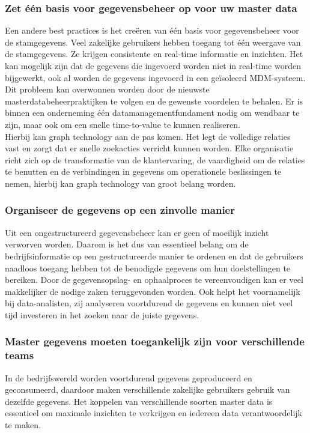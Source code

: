 \subsubsection{Zet één basis voor gegevensbeheer op voor uw master data}
Een andere best practices is het creëren van één basis voor gegevensbeheer voor de stamgegevens. Veel zakelijke gebruikers hebben toegang tot één weergave van de stamgegevens. Ze krijgen consistente en real-time informatie en inzichten. Het kan mogelijk zijn dat de gegevens die ingevoerd worden niet in real-time worden bijgewerkt, ook al worden de gegevens ingevoerd in een geïsoleerd MDM-systeem. Dit probleem kan overwonnen worden door de nieuwste masterdatabeheerpraktijken te volgen en de gewenste voordelen te behalen. Er is binnen een onderneming één datamanagementfundament nodig om wendbaar te zijn, maar ook om een snelle time-to-value te kunnen realiseren.
\\Hierbij kan graph technology aan de pas komen. Het legt de volledige relaties vast en zorgt dat er snelle zoekacties verricht kunnen worden. Elke organisatie richt zich op de transformatie van de klantervaring, de vaardigheid om de relaties te benutten en de verbindingen in gegevens om operationele beslissingen te nemen, hierbij kan graph technology van groot belang worden. 

\subsubsection{Organiseer de gegevens op een zinvolle manier}
Uit een ongestructureerd gegevensbeheer kan er geen of moeilijk inzicht verworven worden. Daarom is het dus van essentieel belang om de bedrijfsinformatie op een gestructureerde manier te ordenen en dat de gebruikers naadloos toegang hebben tot de benodigde gegevens om hun doelstellingen te bereiken. Door de gegevensopslag- en ophaalproces te vereenvoudigen kan er veel makkelijker de nodige zaken teruggevonden worden. Ook helpt het voornamelijk bij data-analisten, zij analyseren voortdurend de gegevens en kunnen niet veel tijd investeren in het zoeken naar de juiste gegevens. 

\subsubsection{Master gegevens moeten toegankelijk zijn voor verschillende teams}
In de bedrijfswereld worden voortdurend gegevens geproduceerd en geconsumeerd, daardoor maken verschillende zakelijke gebruikers gebruik van dezelfde gegevens. Het koppelen van verschillende soorten master data is essentieel om maximale inzichten te verkrijgen en iedereen data verantwoordelijk te maken. 

